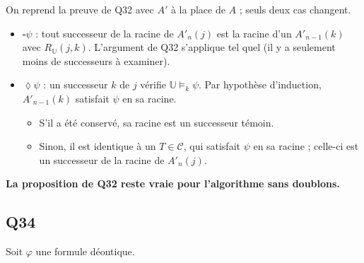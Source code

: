 \documentclass[11pt,a4paper]{article}
\providecommand{\tightlist}{\setlength{\itemsep}{0pt}\setlength{\parskip}{0pt}}
\providecommand{\Box}{\square}
\providecommand{\Diamond}{\lozenge}
\begin{document}
On reprend la preuve de Q32 avec \(A'\) à la place de \(A\) ; seuls deux cas changent.

\begin{itemize}
\tightlist
\item
  \(\Box\psi\) : tout successeur de la racine de \(A'_n(j)\) est la racine d'un \(A'_{n-1}(k)\) avec \(R_{\mathbb U}(j,k)\). L'argument de Q32 s'applique tel quel (il y a seulement moins de successeurs à examiner).
\item
  \(\Diamond\psi\) : un successeur \(k\) de \(j\) vérifie \(\mathbb U\models_k\psi\). Par hypothèse d'induction, \(A'_{n-1}(k)\) satisfait \(\psi\) en sa racine.

  \begin{itemize}
  \tightlist
  \item
    S'il a été conservé, sa racine est un successeur témoin.
  \item
    Sinon, il est identique à un \(T\in\mathcal C\), qui satisfait \(\psi\) en sa racine ; celle-ci est un successeur de la racine de \(A'_n(j)\).
  \end{itemize}
\end{itemize}

\textbf{La proposition de Q32 reste vraie pour l'algorithme sans doublons.}

\hypertarget{q34}{%
\subsection{Q34}\label{q34}}

Soit \(\varphi\) une formule déontique.
\end{document}
